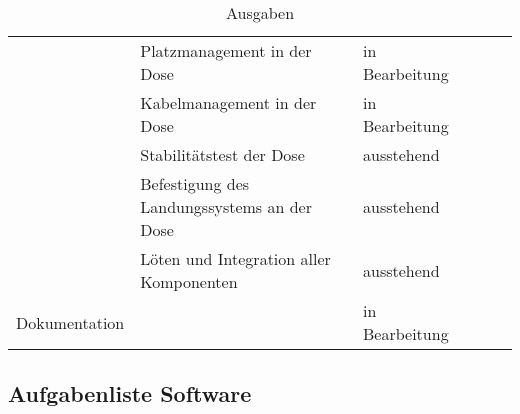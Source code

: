 \begin{table}[H]
\begin{tabular}{p{3cm}p{7cm}p{3cm}rrr}
	& Platzmanagement in der Dose & in Bearbeitung\\
	& Kabelmanagement in der Dose & in Bearbeitung\\
	& Stabilitätstest der Dose & ausstehend\\
	& Befestigung des Landungssystems an der Dose & ausstehend\\
	& Löten und Integration aller Komponenten & ausstehend\\
	\midrule
	Dokumentation & & in Bearbeitung\\
    \bottomrule
    \bottomrule
    \end{tabular}%
    \caption{Ausgaben}
  \label{tab:aufgabenliste_hardware}%
\end{table}%

\subsection{Aufgabenliste Software}
